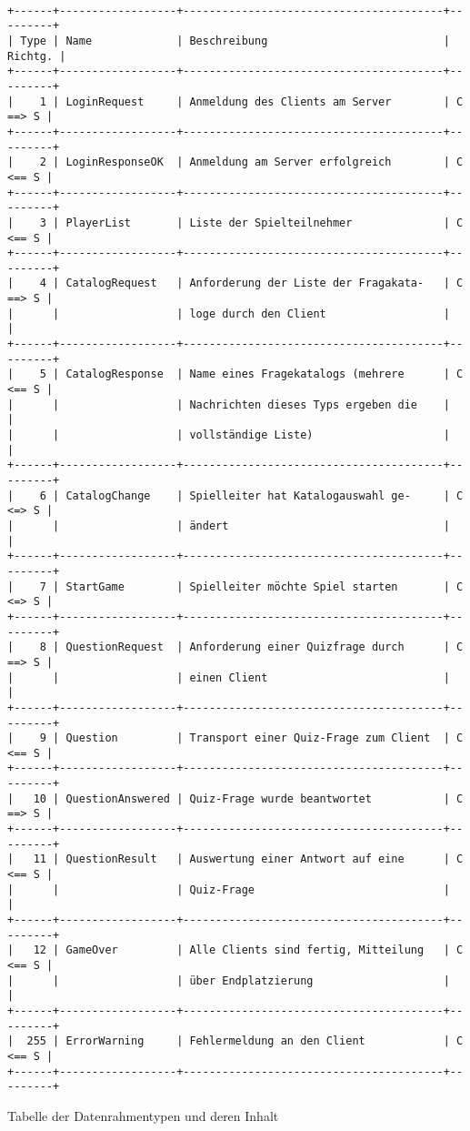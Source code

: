 \documentclass[a4paper,10pt]{article}
\begin{document}
\begin{Verbatim}[fontfamily=courier]

+------+------------------+----------------------------------------+---------+
| Type | Name             | Beschreibung                           | Richtg. |
+------+------------------+----------------------------------------+---------+
|    1 | LoginRequest     | Anmeldung des Clients am Server        | C ==> S |
+------+------------------+----------------------------------------+---------+
|    2 | LoginResponseOK  | Anmeldung am Server erfolgreich        | C <== S |
+------+------------------+----------------------------------------+---------+
|    3 | PlayerList       | Liste der Spielteilnehmer              | C <== S |
+------+------------------+----------------------------------------+---------+
|    4 | CatalogRequest   | Anforderung der Liste der Fragakata-   | C ==> S |
|      |                  | loge durch den Client                  |         |
+------+------------------+----------------------------------------+---------+
|    5 | CatalogResponse  | Name eines Fragekatalogs (mehrere      | C <== S |
|      |                  | Nachrichten dieses Typs ergeben die    |         |
|      |                  | vollständige Liste)                    |         |
+------+------------------+----------------------------------------+---------+
|    6 | CatalogChange    | Spielleiter hat Katalogauswahl ge-     | C <=> S |
|      |                  | ändert                                 |         |
+------+------------------+----------------------------------------+---------+
|    7 | StartGame        | Spielleiter möchte Spiel starten       | C <=> S |
+------+------------------+----------------------------------------+---------+
|    8 | QuestionRequest  | Anforderung einer Quizfrage durch      | C ==> S |
|      |                  | einen Client                           |         |
+------+------------------+----------------------------------------+---------+
|    9 | Question         | Transport einer Quiz-Frage zum Client  | C <== S |
+------+------------------+----------------------------------------+---------+
|   10 | QuestionAnswered | Quiz-Frage wurde beantwortet           | C ==> S |
+------+------------------+----------------------------------------+---------+
|   11 | QuestionResult   | Auswertung einer Antwort auf eine      | C <== S |
|      |                  | Quiz-Frage                             |         |
+------+------------------+----------------------------------------+---------+
|   12 | GameOver         | Alle Clients sind fertig, Mitteilung   | C <== S |
|      |                  | über Endplatzierung                    |         |
+------+------------------+----------------------------------------+---------+
|  255 | ErrorWarning     | Fehlermeldung an den Client            | C <== S |
+------+------------------+----------------------------------------+---------+
\end{Verbatim}
Tabelle der Datenrahmentypen und deren Inhalt
\end{document}

